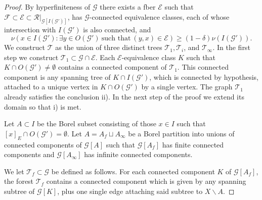 \documentclass[10pt,a4paper]{amsart}
\begin{document}
\begin{proof}
    By hyperfiniteness of $\mathcal{G}$ there exists a fber $\mathcal E$ such that $\mathcal{F} \subset \mathcal{E} \subset \mathcal{R}|_{\mathcal G[I(\mathcal G')]}$, has $\mathcal G$-connected equivalence classes, each of whose intersection with $I(\mathcal G')$ is also connected, and  \begin{equation*}
    \nu \left(x \in I(\mathcal G') : \exists y \in O(\mathcal{G}')\ \text{such that}\ (y,x) \in \mathcal{E}\right) \ge (1-\delta) \nu (I(\mathcal{G}')).
    \end{equation*}
    We construct $\mathcal{T}$ as the union of three distinct trees $\mathcal T_1, \mathcal T_i$, and $\mathcal T_\infty$. In the first step we construct $\mathcal{T}_1 \subset \mathcal{G} \cap \mathcal E$. Each $\mathcal E$-equivalence class $K$ such that $K \cap O(\mathcal G') \neq \emptyset$ contains a connected component of $\mathcal T_1$. This connected component is any spanning tree of $K \cap I(\mathcal G')$, which is connected by hypothesis, attached to a unique vertex in $K\cap O (\mathcal{G}')$ by a single vertex. The graph $\mathcal T_1$ already satisfies the conclusion ii). In the next step of the proof we extend its domain so that i) is met. 
    
    Let $A\subset I$ be the Borel subset consisting of those $x\in I$ such that $[x]_E \cap O (\mathcal{G}') = \emptyset$. Let $A = A_f \sqcup A_\infty$ be a Borel partition into unions of connected components of $\mathcal{G}[A]$ such that $\mathcal{G}[A_f]$ has finite connected components and $\mathcal{G}[A_\infty]$ has infinite connected components. 
    
    We let $\mathcal{T}_f \subset \mathcal G$ be defined as follows. For each connected component $K$ of $\mathcal G [A_f]$, the forest $\mathcal T_f$ contains a connected component which is given by any spanning subtree of $\mathcal G [K]$, plus one single edge attaching said subtree to $X \backslash A$. 
    

\end{proof}
\end{document}
